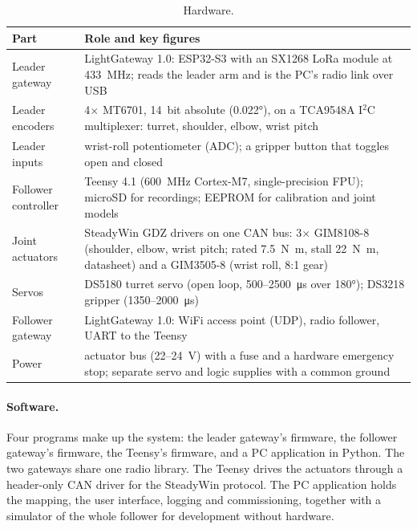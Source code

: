 \documentclass[11pt,a4paper]{article}
\begin{document}
\begin{table}[ht]
\centering\small
\begin{tabularx}{\linewidth}{@{}lL@{}}
\toprule
Part & Role and key figures \\
\midrule
Leader gateway & LightGateway 1.0: ESP32-S3 with an SX1268 LoRa module at \SI{433}{\mega\hertz}; reads the
                 leader arm and is the PC's radio link over USB \\
Leader encoders & 4$\times$ MT6701, \SI{14}{bit} absolute (\ang{0.022}), on a TCA9548A I$^2$C multiplexer:
                 turret, shoulder, elbow, wrist pitch \\
Leader inputs & wrist-roll potentiometer (ADC); a gripper button that toggles open and closed \\
Follower controller & Teensy 4.1 (\SI{600}{\mega\hertz} Cortex-M7, single-precision FPU); microSD for
                 recordings; EEPROM for calibration and joint models \\
Joint actuators & SteadyWin GDZ drivers on one CAN bus: 3$\times$ GIM8108-8 (shoulder, elbow, wrist pitch;
                 rated \SI{7.5}{\newton\metre}, stall \SI{22}{\newton\metre}, datasheet) and a GIM3505-8 (wrist
                 roll, 8:1 gear) \\
Servos & DS5180 turret servo (open loop, 500--\SI{2500}{\micro\second} over \ang{180}); DS3218 gripper
                 (1350--\SI{2000}{\micro\second}) \\
Follower gateway & LightGateway 1.0: WiFi access point (UDP), radio follower, UART to the Teensy \\
Power & actuator bus (22--\SI{24}{\volt}) with a fuse and a hardware emergency stop; separate servo and logic
                 supplies with a common ground \\
\bottomrule
\end{tabularx}
\caption{Hardware.}
\label{tab:hw}
\end{table}

\paragraph{Software.} Four programs make up the system: the leader gateway's firmware, the follower gateway's
firmware, the Teensy's firmware, and a PC application in Python. The two gateways share one radio library. The
Teensy drives the actuators through a header-only CAN driver for the SteadyWin protocol. The PC application
holds the mapping, the user interface, logging and commissioning, together with a simulator of the whole
follower for development without hardware.
\end{document}
